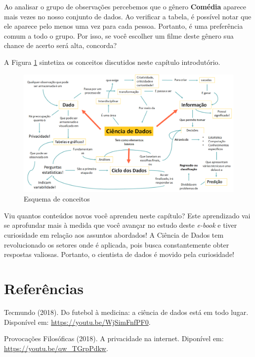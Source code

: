 \documentclass[
  portuguese,
  oneside]{book}
\begin{document}
Ao analisar o grupo de observações percebemos que o gênero \textbf{Comédia} aparece mais vezes no nosso conjunto de dados. Ao verificar a tabela, é possível notar que ele aparece pelo menos uma vez para cada pessoa. Portanto, é uma preferência comum a todo o grupo. Por isso, se você escolher um filme deste gênero sua chance de acerto será alta, concorda?

A Figura \ref{fig:figura9} sintetiza os conceitos discutidos neste capítulo introdutório.

\begin{figure}

{\centering \includegraphics[width=1\linewidth]{fig_cap1/mapaconceitualcap01} 

}

\caption{Esquema de conceitos}\label{fig:figura9}
\end{figure}

Viu quantos conteúdos novos você aprendeu neste capítulo? Este aprendizado vai se aprofundar mais à medida que você avançar no estudo deste \emph{e-book} e tiver curiosidade em relação aos assuntos abordados! A Ciência de Dados tem revolucionado os setores onde é aplicada, pois busca constantemente obter respostas valiosas. Portanto, o cientista de dados é movido pela curiosidade!

\hypertarget{referuxeancias}{%
\section{Referências}\label{referuxeancias}}

Tecmundo (2018). Do futebol à medicina: a ciência de dados está em todo lugar. Disponível em: \url{https://youtu.be/WjSimFnfPF0}.

Provocações Filosóficas (2018). A privacidade na internet. Diponível em: \url{https://youtu.be/qw_TGrpPdkw}.
\end{document}
